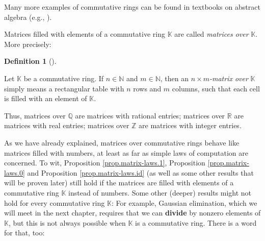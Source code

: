 \documentclass[numbers=enddot,12pt,final,onecolumn,notitlepage]{scrartcl}%
\theoremstyle{definition}
\newtheorem{defi}[theo]{Definition}
\newenvironment{definition}[1][]
{\begin{defi}[#1]\begin{leftbar}}
{\end{leftbar}\end{defi}}
\begin{document}
Many more examples of commutative rings can be found in textbooks on abstract
algebra (e.g., \cite[Chapter 11]{Artin10}).

Matrices filled with elements of a commutative ring $\mathbb{K}$ are called
\textit{matrices over }$\mathbb{K}$. More precisely:

\begin{definition}
Let $\mathbb{K}$ be a commutative ring. If $n\in\mathbb{N}$ and $m\in
\mathbb{N}$, then an $n\times m$\textit{-matrix over }$\mathbb{K}$ simply
means a rectangular table with $n$ rows and $m$ columns, such that each cell
is filled with an element of $\mathbb{K}$.
\end{definition}

Thus, matrices over $\mathbb{Q}$ are matrices with rational entries; matrices
over $\mathbb{R}$ are matrices with real entries; matrices over $\mathbb{Z}$
are matrices with integer entries.

As we have already explained, matrices over commutative rings behave like
matrices filled with numbers, at least as far as simple laws of computation
are concerned. To wit, Proposition \ref{prop.matrix-laws.1}, Proposition
\ref{prop.matrix-laws.0} and Proposition \ref{prop.matrix-laws.id} (as well as
some other results that will be proven later) still hold if the matrices are
filled with elements of a commutative ring $\mathbb{K}$ instead of numbers.
Some other (deeper) results might not hold for every commutative ring
$\mathbb{K}$: For example, Gaussian elimination, which we will meet in the
next chapter, requires that we can \textbf{divide} by nonzero elements of
$\mathbb{K}$, but this is not always possible when $\mathbb{K}$ is a
commutative ring. There is a word for that, too:
\end{document}
